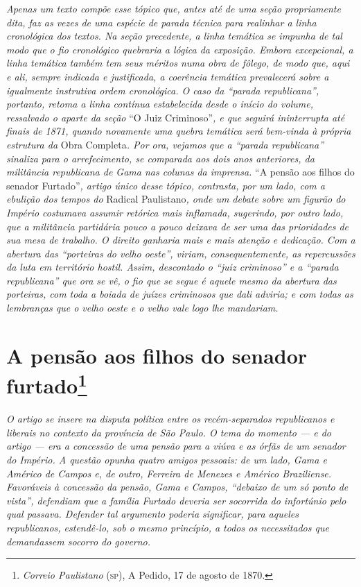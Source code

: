 \begin{argumento}
\emph{Apenas um texto compõe esse tópico que, antes até de uma seção
propriamente dita, faz as vezes de uma espécie de parada técnica para
realinhar a linha cronológica dos textos. Na seção precedente, a linha
temática se impunha de tal modo que o fio cronológico quebraria a lógica
da exposição. Embora excepcional, a linha temática também tem seus
méritos numa obra de fôlego, de modo que, aqui e ali, sempre indicada e
justificada, a coerência temática prevalecerá sobre a igualmente
instrutiva ordem cronológica. O caso da ``parada republicana'', portanto,
retoma a linha contínua estabelecida desde o início do volume,
ressalvado o aparte da seção} ``O Juiz Criminoso''\emph{, e que seguirá
ininterrupta até finais de 1871, quando novamente uma quebra temática
será bem-vinda à própria estrutura da} Obra Completa\emph{. Por ora,
vejamos que a ``parada republicana'' sinaliza para o arrefecimento, se
comparada aos dois anos anteriores, da militância republicana de Gama
nas colunas da imprensa.} ``A pensão aos filhos do senador
Furtado''\emph{, artigo único desse tópico, contrasta, por um lado, com a
ebulição dos tempos do} Radical Paulistano\emph{, onde um debate sobre
um figurão do Império costumava assumir retórica mais inflamada,
sugerindo, por outro lado, que a militância partidária pouco a pouco
deixava de ser uma das prioridades de sua mesa de trabalho. O direito
ganharia mais e mais atenção e dedicação. Com a abertura das ``porteiras
do velho oeste'', viriam, consequentemente, as repercussões da luta em
território hostil. Assim, descontado o ``juiz criminoso'' e a ``parada
republicana'' que ora se vê, o fio que se segue é aquele mesmo da
abertura das porteiras, com toda a boiada de juízes criminosos que dali
adviria; e com todas as lembranças que o velho oeste e o velho vale logo
lhe mandariam.}
\end{argumento}

\chapter{A pensão aos filhos do senador furtado\footnote{\emph{Correio Paulistano} (\textsc{sp}), A Pedido, 17 de agosto de 1870.}}%

\begin{didascalia}
\emph{O artigo se insere na disputa política entre os recém-separados
republicanos e liberais no contexto da província de São Paulo. O tema do
momento --- e do artigo --- era a concessão de uma pensão para a viúva e
as órfãs de um senador do Império. A questão opunha quatro amigos
pessoais: de um lado, Gama e Américo de Campos e, de outro, Ferreira de
Menezes e Américo Braziliense. Favoráveis à concessão da pensão, Gama e
Campos, ``debaixo de um só ponto de vista'', defendiam que a família
Furtado deveria ser socorrida do infortúnio pelo qual passava. Defender
tal argumento poderia significar, para aqueles republicanos, estendê-lo,
sob o mesmo princípio, a todos os necessitados que demandassem socorro
do governo.}
\end{didascalia}


